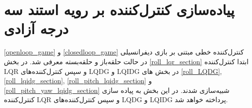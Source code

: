 \section{پیاده‌سازی کنترل‌کننده بر رویه استند سه درجه آزادی}
\ref{openloop_game}
و
\ref{closedloop_game}
کنترل‌کننده خطی مبتنی بر بازی دیفرانسیلی در حالت حلقه‌باز و حلقه‌بسته معرفی شد. در بخش
\ref{roll_lqr_section}
ابتدا کنترل‌کننده LQR و سپس کنترل‌کننده‌های LQDG و LQIDG در بخش های
\ref{roll_LQDG},
\ref{roll_lqidg_section},
\ref{roll_pitch_lqidg_section}
و
\ref{roll_pitch_yaw_lqidg_section}
شبیه‌سازی شدند.
در این بخش به پیاده سازی کنترل‌کننده LQR و سپس کنترل‌کننده‌های LQDG و LQIDG پرداخته خواهد شد.
